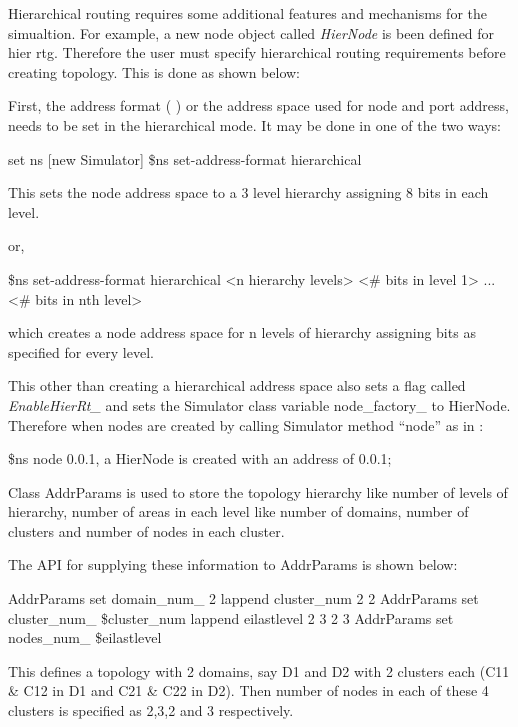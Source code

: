 Hierarchical routing requires some additional features and mechanisms
for the simualtion. For example, a new node object called {\em HierNode}
is been defined for hier rtg. Therefore the user must specify
hierarchical routing requirements before creating topology. This is done
as shown below: 

First, the address format (\label{chap:address} ) or the address space
used for node and port address, needs to be set in the hierarchical
mode. It may be done in one of the two ways:

\begin{program}
  set ns [new Simulator]
  \$ns set-address-format hierarchical
\end{program} 

This sets the node address space to a 3 level hierarchy assigning 8 bits
in each level.

or,
\begin{program}
  \$ns set-address-format hierarchical <n hierarchy levels> <\# bits in
  level 1> ...<\# bits in nth level>
\end{program} 

which creates a node address space for n levels of hierarchy assigning
bits as specified for every level.

This other than creating a hierarchical address space also sets a flag
called {\em EnableHierRt\_} and sets the Simulator class variable
node\_factory\_ to HierNode.  
Therefore when nodes are created by calling Simulator method ``node'' as
in :

\$ns node 0.0.1,
a HierNode is created with an address of 0.0.1;

Class AddrParams is used to store the topology hierarchy like number
of levels of hierarchy, number of areas in each level like number of
domains, number of clusters and number of nodes in each cluster.

The API for supplying these information to AddrParams is shown below:

\begin{program}
AddrParams set domain_num_ 2
lappend cluster_num 2 2
AddrParams set cluster_num_ \$cluster_num
lappend eilastlevel 2 3 2 3
AddrParams set nodes_num_ \$eilastlevel
\end{program}

This defines a topology with 2 domains, say D1 and D2 with 2 clusters
each (C11 \& C12 in D1 and C21 \& C22 in D2). Then number of nodes in
each of these 4 clusters is specified as 2,3,2 and 3 respectively.

